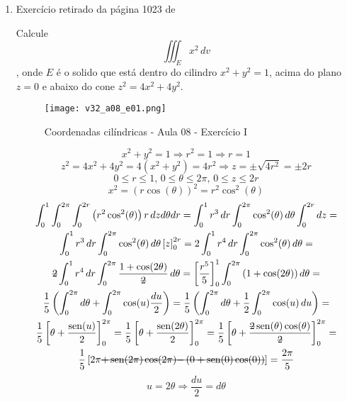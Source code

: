 \begin{enumerate}
	\item Exercício retirado da página 1023 de \cite{James_Stewart_calculo_v2}
	
	Calcule $$\iiint_E x^2\, dv$$, onde $E$ é o solido que está dentro do cilindro $x^2 + y^2 = 1$, acima do plano $z = 0$ e abaixo do cone $z^2 = 4x^2 + 4y^2$.
	
	\begin{figure}[htb]
		\caption{Coordenadas cilíndricas - Aula 08 - Exercício I}
		\label{v32_a08_e01}
		\centering
		\texttt{[image: v32\_a08\_e01.png]}		
	\end{figure}
	
	\begin{equation*}
		x^2 + y^2 = 1 \Rightarrow r^2 = 1 \Rightarrow r = 1
	\end{equation*}
	\begin{equation*}
		z^2 = 4x^2 + 4y^2 = 4\left(x^2 + y^2\right) = 4r^2 \Rightarrow z = \pm\sqrt{4r^2} = \pm 2r 
	\end{equation*}
	\begin{equation*}
		0 \leq r \leq 1,\, 0 \leq \theta \leq 2\pi,\, 0 \leq z \leq 2r
	\end{equation*}
	\begin{equation*}
		x^2 = \left(r\cos(\theta)\right)^2 = r^2\cos^2(\theta)
	\end{equation*}
	\begin{gather*}
		\int_0^1 \int_0^{2\pi} \int_0^{2r} \left(r^2\cos^2(\theta)\right)r\,dz d\theta dr = \int_0^1 r^3\, dr \int_0^{2\pi} \cos^2(\theta)\, d\theta \int_0^{2r} dz =\\ \int_0^1 r^3\, dr \int_0^{2\pi} \cos^2(\theta)\, d\theta \left[z\right]_0^{2r} = 2\int_0^1 r^4\, dr \int_0^{2\pi} \cos^2(\theta)\, d\theta =\\ {\overstrike{2}}\int_0^1 r^4\, dr \int_0^{2\pi} \dfrac{1 + \cos(2\theta)}{\overstrike{2}}\, d\theta = \left[\dfrac{r^5}{5}\right]_0^1 \int_0^{2\pi} \left(1 + \cos(2\theta)\right) d\theta =\\ \dfrac{1}{5} \left(\int_0^{2\pi} d\theta + \int_0^{2\pi}\cos(u) \dfrac{du}{2}\right) = \dfrac{1}{5} \left(\int_0^{2\pi} d\theta + \dfrac{1}{2}\int_0^{2\pi}\cos(u)\,du\right)	=\\ \dfrac{1}{5} \left[\theta + \dfrac{\sen(u)}{2}\right]_0^{2\pi}	= \dfrac{1}{5} \left[\theta + \dfrac{\sen(2\theta)}{2}\right]_0^{2\pi} = \dfrac{1}{5} \left[\theta + \dfrac{\overstrike{2}\sen(\theta)\cos(\theta)}{\overstrike{2}}\right]_0^{2\pi} =\\ \dfrac{1}{5} \left[2\pi \overstrike{+ \sen(2\pi)\cos(2\pi)} \overstrike{- \left(0 + \sen(0)\cos(0)\right)}\right] = \frac{2\pi}{5}
	\end{gather*}
	\begin{equation*}
		u = 2\theta \Rightarrow \dfrac{du}{2} = d\theta        
	\end{equation*}
\end{enumerate}